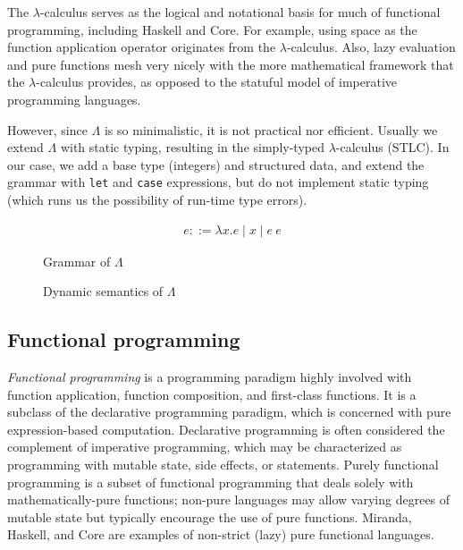 The $\lambda$-calculus serves as the logical and notational basis for much of functional programming, including Haskell and Core. For example, using space as the function application operator originates from the $\lambda$-calculus. Also, lazy evaluation and pure functions mesh very nicely with the more mathematical framework that the $\lambda$-calculus provides, as opposed to the statuful model of imperative programming languages.

However, since $\Lambda$ is so minimalistic, it is not practical nor efficient. Usually we extend $\Lambda$ with static typing, resulting in the simply-typed $\lambda$-calculus (STLC). In our case, we add a base type (integers) and structured data, and extend the grammar with \texttt{let} and \texttt{case} expressions, but do not implement static typing (which runs us the possibility of run-time type errors).

\begin{figure}
  \centering
  \begin{align*}
    e ::= \lambda x.e \mid x \mid e\ e
  \end{align*}
  \caption{Grammar of $\Lambda$}
  \label{fig:ulc-grammar}
\end{figure}

\begin{figure}
  \centering
  \caption{Dynamic semantics of $\Lambda$}
  \label{fig:ulc-dynamics}
\end{figure}

\subsection{Functional programming}
\label{sec:fp}

\textit{Functional programming} is a programming paradigm highly involved with function application, function composition, and first-class functions. It is a subclass of the declarative programming paradigm, which is concerned with pure expression-based computation. Declarative programming is often considered the complement of imperative programming, which may be characterized as programming with mutable state, side effects, or statements. Purely functional programming is a subset of functional programming that deals solely with mathematically-pure functions; non-pure languages may allow varying degrees of mutable state but typically encourage the use of pure functions. Miranda, Haskell, and Core are examples of non-strict (lazy) pure functional languages.

